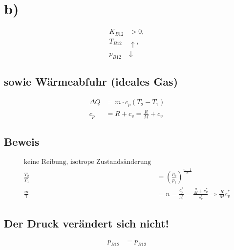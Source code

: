 

\section*{b)}
\begin{align*}
    K_{B12} &> 0, \\
    T_{B12} & \uparrow, \\
    p_{B12} & \downarrow
\end{align*}

\subsection*{sowie Wärmeabfuhr (ideales Gas)}
\begin{align*}
    \Delta Q &= m \cdot c_p \left( T_2 - T_1 \right) \\
    c_p &= R + c_v = \frac{R}{M} + c_v
\end{align*}

\subsection*{Beweis}
\begin{align*}
    \text{keine Reibung, isotrope Zustandsänderung} \\
    \frac{T_2}{T_1} &= \left( \frac{p_2}{p_1} \right)^{\frac{n-1}{n}} \\
    \frac{m}{1} &= n = \frac{c_p^*}{c_v^*} = \frac{\frac{R}{M} + c_v^*}{c_v^*} \Rightarrow \frac{R}{M}c_v^*
\end{align*}

\subsection*{Der Druck verändert sich nicht!}
\begin{align*}
    p_{B12} &= p_{B12}
\end{align*}